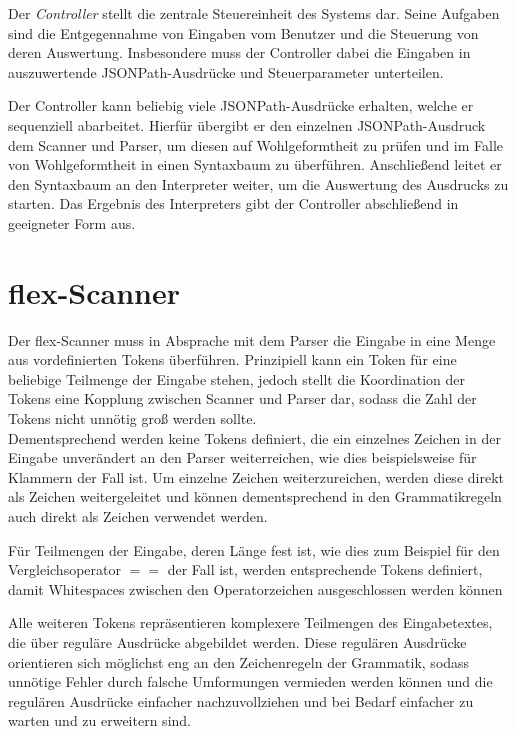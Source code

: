 \documentclass[oneside]{ausarbeitung}
\begin{document}
Der \textit{Controller} stellt die zentrale Steuereinheit des Systems dar. Seine Aufgaben sind die Entgegennahme von Eingaben vom Benutzer und die Steuerung von deren Auswertung. Insbesondere muss der Controller dabei die Eingaben in auszuwertende JSONPath-Ausdrücke und Steuerparameter unterteilen.

Der Controller kann beliebig viele JSONPath-Ausdrücke erhalten, welche er sequenziell abarbeitet. Hierfür übergibt er den einzelnen JSONPath-Ausdruck dem Scanner und Parser, um diesen auf Wohlgeformtheit zu prüfen und im Falle von Wohlgeformtheit in einen Syntaxbaum zu überführen. Anschließend leitet er den Syntaxbaum an den Interpreter weiter, um die Auswertung des Ausdrucks zu starten. Das Ergebnis des Interpreters gibt der Controller abschließend in geeigneter Form aus.


	
\section{flex-Scanner}

Der flex-Scanner muss in Absprache mit dem Parser die Eingabe in eine Menge aus vordefinierten Tokens überführen. Prinzipiell kann ein Token für eine beliebige Teilmenge der Eingabe stehen, jedoch stellt die Koordination der Tokens eine Kopplung zwischen Scanner und Parser dar, sodass die Zahl der Tokens nicht unnötig groß werden sollte. \\
Dementsprechend werden keine Tokens definiert, die ein einzelnes Zeichen in der Eingabe unverändert an den Parser weiterreichen, wie dies beispielsweise für Klammern der Fall ist. Um einzelne Zeichen weiterzureichen, werden diese direkt als Zeichen weitergeleitet und können dementsprechend in den Grammatikregeln auch direkt als Zeichen verwendet werden. 

Für Teilmengen der Eingabe, deren Länge fest ist, wie dies zum Beispiel für den Vergleichsoperator $==$ der Fall ist, werden entsprechende Tokens definiert, damit Whitespaces zwischen den Operatorzeichen ausgeschlossen werden können

Alle weiteren Tokens repräsentieren komplexere Teilmengen des Eingabetextes, die über reguläre Ausdrücke abgebildet werden. Diese regulären Ausdrücke orientieren sich möglichst eng an den Zeichenregeln der Grammatik, sodass unnötige Fehler durch falsche Umformungen vermieden werden können und die regulären Ausdrücke einfacher nachzuvollziehen und bei Bedarf einfacher zu warten und zu erweitern sind.
\end{document}
